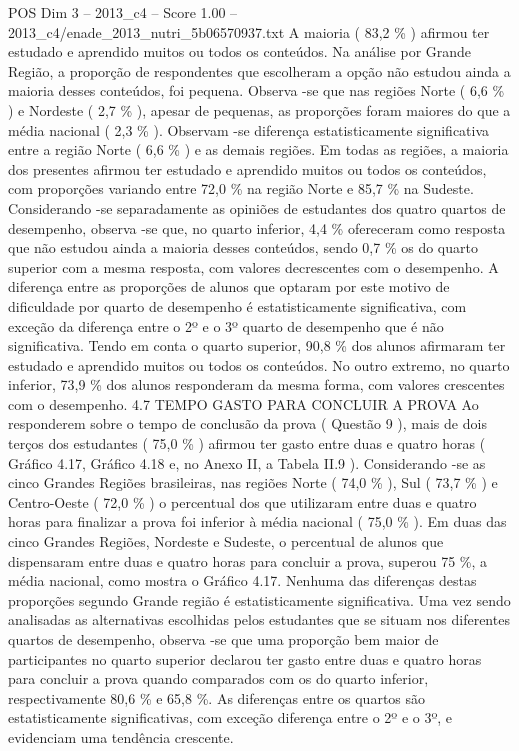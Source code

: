 \begin{textsample}{POS Dim 3 – 2013\_c4 – Score 1.00 – 2013\_c4/enade\_2013\_nutri\_5b06570937.txt}
A maioria ( 83,2 \% ) afirmou ter estudado e aprendido muitos ou todos os conteúdos.
Na análise por Grande Região, a proporção de respondentes que escolheram a opção não estudou ainda a maioria desses conteúdos, foi pequena.
Observa -se que nas regiões Norte ( 6,6 \% ) e Nordeste ( 2,7 \% ), apesar de pequenas, as proporções foram maiores do que a média nacional ( 2,3 \% ).
Observam -se diferença estatisticamente significativa entre a região Norte ( 6,6 \% ) e as demais regiões.
Em todas as regiões, a maioria dos presentes afirmou ter estudado e aprendido muitos ou todos os conteúdos, com proporções variando entre 72,0 \% na região Norte e 85,7 \% na Sudeste.
Considerando -se separadamente as opiniões de estudantes dos quatro quartos de desempenho, observa -se que, no quarto inferior, 4,4 \% ofereceram como resposta que não estudou ainda a maioria desses conteúdos, sendo 0,7 \% os do quarto superior com a mesma resposta, com valores decrescentes com o desempenho.
A diferença entre as proporções de alunos que optaram por este motivo de dificuldade por quarto de desempenho é estatisticamente significativa, com exceção da diferença entre o 2º e o 3º quarto de desempenho que é não significativa.
Tendo em conta o quarto superior, 90,8 \% dos alunos afirmaram ter estudado e aprendido muitos ou todos os conteúdos.
No outro extremo, no quarto inferior, 73,9 \% dos alunos responderam da mesma forma, com valores crescentes com o desempenho. 4.7 TEMPO GASTO PARA CONCLUIR A PROVA Ao responderem sobre o tempo de conclusão da prova ( Questão 9 ), mais de dois terços dos estudantes ( 75,0 \% ) afirmou ter gasto entre duas e quatro horas ( Gráfico 4.17, Gráfico 4.18 e, no Anexo II, a Tabela II.9 ).
Considerando -se as cinco Grandes Regiões brasileiras, nas regiões Norte ( 74,0 \% ), Sul ( 73,7 \% ) e Centro-Oeste ( 72,0 \% ) o percentual dos que utilizaram entre duas e quatro horas para finalizar a prova foi inferior à média nacional ( 75,0 \% ).
Em duas das cinco Grandes Regiões, Nordeste e Sudeste, o percentual de alunos que dispensaram entre duas e quatro horas para concluir a prova, superou 75 \%, a média nacional, como mostra o Gráfico 4.17.
Nenhuma das diferenças destas proporções segundo Grande região é estatisticamente significativa.
Uma vez sendo analisadas as alternativas escolhidas pelos estudantes que se situam nos diferentes quartos de desempenho, observa -se que uma proporção bem maior de participantes no quarto superior declarou ter gasto entre duas e quatro horas para concluir a prova quando comparados com os do quarto inferior, respectivamente 80,6 \% e 65,8 \%.
As diferenças entre os quartos são estatisticamente significativas, com exceção diferença entre o 2º e o 3º, e evidenciam uma tendência crescente.

\end{textsample}
